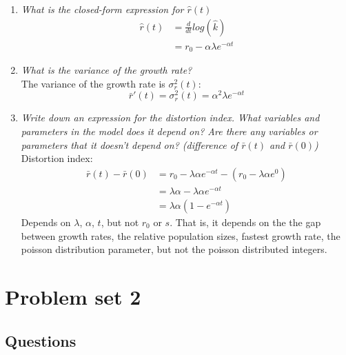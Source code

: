 \documentclass[]{book}
\providecommand{\tightlist}{%
  \setlength{\itemsep}{0pt}\setlength{\parskip}{0pt}}
\begin{document}
\begin{enumerate}
  \begin{enumerate}
  \def\labelenumii{\alph{enumii}.}
  \tightlist
  \item
    \emph{What is the closed-form expression for \(\hat{r}(t)\)}\\
    \[\begin{aligned}
     \hat{r}(t) &= \frac{d}{dt}log(\hat{k})\\
     &= r_0 - \alpha \lambda e^{-\alpha t}
     \end{aligned}\]
  \item
    \emph{What is the variance of the growth rate?}\\
    The variance of the growth rate is \(\sigma_r^2(t)\):
    \[\bar{r}'(t)= \sigma^2_r(t) = \alpha^2\lambda e^{-\alpha t}\]
  \item
    \emph{Write down an expression for the distortion index. What variables and parameters in the model does it depend on? Are there any variables or parameters that it doesn't depend on? (difference of \(\bar{r}(t)\) and \(\bar{r}(0)\))}\\
    Distortion index:
    \[\begin{aligned}
     \bar{r}(t) - \bar{r}(0) & = r_0 - \lambda \alpha e^{-\alpha t} - (r_0 - \lambda \alpha e^{0}) \\
     & = \lambda \alpha - \lambda \alpha e^{-\alpha t}\\
     & = \lambda \alpha(1-e^{-\alpha t})
     \end{aligned}\]
    Depends on \(\lambda\), \(\alpha\), \(t\), but not \(r_0\) or \(s\). That is, it depends on the the gap between growth rates, the relative population sizes, fastest growth rate, the poisson distribution parameter, but not the poisson distributed integers.
  \end{enumerate}
\end{enumerate}

\hypertarget{problem-set-2}{%
\chapter{Problem set 2}\label{problem-set-2}}

\hypertarget{questions-1}{%
\section{Questions}\label{questions-1}}
\end{document}
